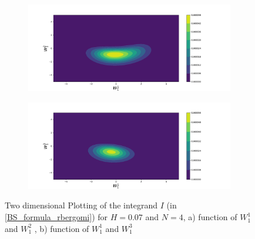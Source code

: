 \documentclass[11pt]{article}
\begin{document}
\begin{figure}[h!]
	\centering
	\begin{subfigure}{.45\textwidth}
		\centering
		\includegraphics[width=1\linewidth]{./figures/integrand_plotting_rBergomi/2D_plots/N_4/H_007/Bergomi_integrand_contours_K_1_H_007_W1_1_2_N_4}
		\caption{}
		\label{fig:sub3}
	\end{subfigure}%
	\begin{subfigure}{.45\textwidth}
		\centering
		\includegraphics[width=1\linewidth]{./figures/integrand_plotting_rBergomi/2D_plots/N_4/H_007/Bergomi_integrand_contours_K_1_H_007_W1_1_3_N_4}
		\caption{}
		\label{fig:sub4}
	\end{subfigure}
	\caption{Two dimensional Plotting of the integrand $I$ (in \eqref{BS_formula_rbergomi})  for $H=0.07$ and $N=4$, a)  function of $W_1^1$ and $W_1^2$ , b) function of $W_1^1$ and $W_1^3$ }
	\label{fig:Integrand_H_007_N_4_2D_W_1_2_3}
\end{figure}
\end{document}
